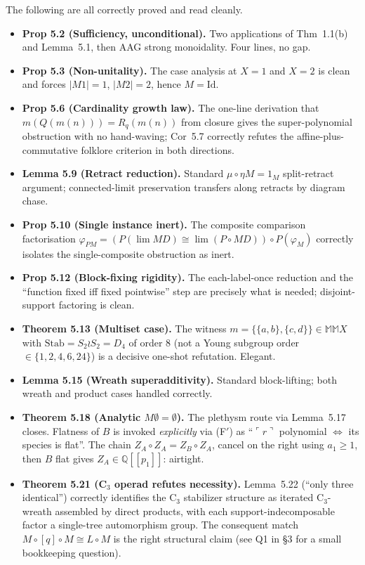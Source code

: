 \documentclass[11pt]{article}
\newcommand{\Stab}{\mathrm{Stab}}
\begin{document}
The following are all correctly proved and read cleanly.

\begin{itemize}[leftmargin=1.5em, itemsep=1pt]
  \item \textbf{Prop 5.2 (Sufficiency, unconditional).} Two applications of Thm~1.1(b) and Lemma~5.1, then AAG strong monoidality. Four lines, no gap.
  \item \textbf{Prop 5.3 (Non-unitality).} The case analysis at $X=1$ and $X=2$ is clean and forces $|M1|=1$, $|M2|=2$, hence $M=\mathrm{Id}$.
  \item \textbf{Prop 5.6 (Cardinality growth law).} The one-line derivation that $m(Q(m(n))) = R_q(m(n))$ from closure gives the super-polynomial obstruction with no hand-waving; Cor~5.7 correctly refutes the affine-plus-commutative folklore criterion in both directions.
  \item \textbf{Lemma 5.9 (Retract reduction).} Standard $\mu \circ \eta M = 1_M$ split-retract argument; connected-limit preservation transfers along retracts by diagram chase.
  \item \textbf{Prop 5.10 (Single instance inert).} The composite comparison factorisation $\varphi_{PM} = (P(\lim MD) \cong \lim(P\circ MD)) \circ P(\varphi_M)$ correctly isolates the single-composite obstruction as inert.
  \item \textbf{Prop 5.12 (Block-fixing rigidity).} The each-label-once reduction and the ``function fixed iff fixed pointwise'' step are precisely what is needed; disjoint-support factoring is clean.
  \item \textbf{Theorem 5.13 (Multiset case).} The witness $m = \{\{a,b\},\{c,d\}\} \in \mathbb{M}\mathbb{M} X$ with $\Stab = S_2 \wr S_2 = D_4$ of order 8 (not a Young subgroup order $\in \{1,2,4,6,24\}$) is a decisive one-shot refutation. Elegant.
  \item \textbf{Lemma 5.15 (Wreath superadditivity).} Standard block-lifting; both wreath and product cases handled correctly.
  \item \textbf{Theorem 5.18 (Analytic $M\emptyset = \emptyset$).} The plethysm route via Lemma~5.17 closes. Flatness of $B$ is invoked \emph{explicitly} via (F$'$) as ``$\ulcorner r \urcorner$ polynomial $\iff$ its species is flat''. The chain $Z_A \circ Z_A = Z_B \circ Z_A$, cancel on the right using $a_1 \ge 1$, then $B$ flat gives $Z_A \in \mathbb{Q}[[p_1]]$: airtight.
  \item \textbf{Theorem 5.21 (C$_3$ operad refutes necessity).} Lemma~5.22 (``only three identical'') correctly identifies the C$_3$ stabilizer structure as iterated C$_3$-wreath assembled by direct products, with each support-indecomposable factor a single-tree automorphism group. The consequent match $M \circ [q] \circ M \cong L \circ M$ is the right structural claim (see Q1 in §3 for a small bookkeeping question).
\end{itemize}
\end{document}
